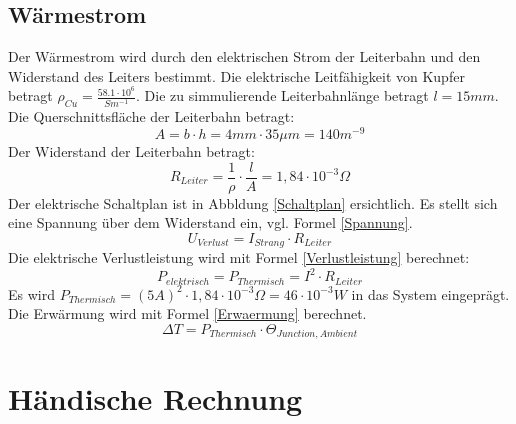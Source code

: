 \documentclass[10pt,a4paper,oneside,abstracton]{scrartcl}
\begin{document}
\begin{multicols}{2}
\subsection{Wärmestrom}
Der Wärmestrom wird durch den elektrischen Strom der Leiterbahn und den Widerstand des Leiters bestimmt. 
\newline
Die elektrische Leitfähigkeit von Kupfer betragt $ \rho_{Cu} = \frac{58.1\cdot 10^6}{Sm^{-1}} $.
\newline
Die zu simmulierende Leiterbahnlänge betragt $l = 15 mm$.
\newline
Die Querschnittsfläche der Leiterbahn betragt: 
\begin{equation}
	A = b \cdot h = 4 mm \cdot 35 \mu m = 140 m^{-9}
\end{equation}
Der Widerstand der Leiterbahn betragt: 
\begin{equation}
	R_{Leiter} = \frac{1}{\rho} \cdot \frac{l}{A} = 1,84 \cdot 10^{-3} \Omega
\end{equation}
\noindent
Der elektrische Schaltplan ist in Abbldung \ref*{Schaltplan} ersichtlich.  \newline
Es stellt sich eine Spannung über dem Widerstand ein, vgl. Formel \ref*{Spannung}. 
\begin{equation}
	U_{Verlust} =  I_{Strang} \cdot R_{Leiter} 
	\label{Spannung}
\end{equation}
\noindent
Die elektrische Verlustleistung wird mit Formel \ref*{Verlustleistung} berechnet: 
\begin{equation}
	P_{elektrisch} = P_{Thermisch} =  I^2 \cdot R_{Leiter} 
	\label{Verlustleistung}
\end{equation}
Es wird
$ P_{Thermisch} = (5A)^2 \cdot 1,84 \cdot 10^{-3} \Omega = 46 \cdot 10^{-3} W $ \newline
in das System eingeprägt.
Die Erwärmung wird mit Formel \ref*{Erwaermung} berechnet.
\begin{equation}
	\Delta T = P_{Thermisch} \cdot \Theta_{Junction, Ambient}
	\label{Erwaermung}
\end{equation}





\section{Händische Rechnung}



\end{multicols}
\end{document}
